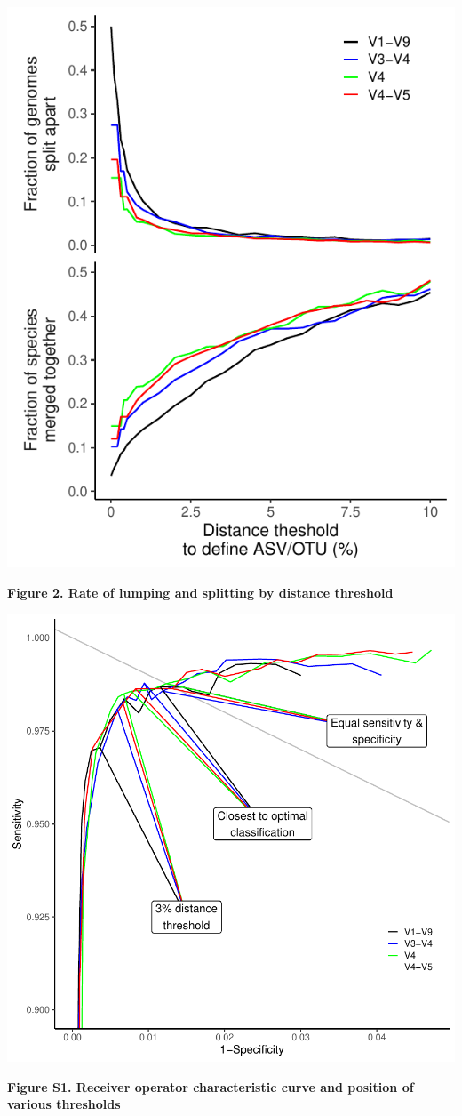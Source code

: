 \documentclass[
]{article}
\begin{document}
\newpage

\includegraphics{../figures/lump_split.pdf}

\textbf{Figure 2. Rate of lumping and splitting by distance threshold}

\newpage

\includegraphics{../figures/roc_curve.pdf}

\textbf{Figure S1. Receiver operator characteristic curve and position
of various thresholds}
\end{document}
